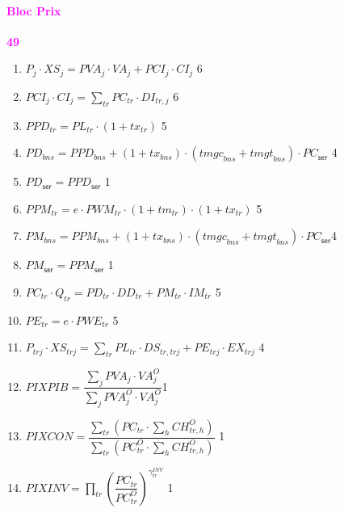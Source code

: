 \documentclass[11pt,a4paper]{article}
\newcommand{\trj}{\mathit{trj}}
\newcommand{\bns}{\mathit{bns}}
\newcommand{\CI}{\mathit{CI}}
\newcommand{\CH}{\mathit{CH}}
\newcommand{\DD}{\mathit{DD}}
\newcommand{\DI}{\mathit{DI}}
\newcommand{\DS}{\mathit{DS}}
\newcommand{\EX}{\mathit{EX}}
\newcommand{\IM}{\mathit{IM}}
\newcommand{\INV}{\mathit{INV}}
\newcommand{\ser}{\mathsf{ser}}
\newcommand{\PE}{\mathit{PE}}
\newcommand{\PC}{\mathit{PC}}
\newcommand{\PCI}{\mathit{PCI}}
\newcommand{\PD}{\mathit{PD}}
\newcommand{\PPD}{\mathit{PPD}}
\newcommand{\PIXPIB}{\mathit{PIXPIB}}
\newcommand{\PIXCON}{\mathit{PIXCON}}
\newcommand{\PIXINV}{\mathit{PIXINV}}
\newcommand{\PL}{\mathit{PL}}
\newcommand{\PM}{\mathit{PM}}
\newcommand{\PPM}{\mathit{PPM}}
\newcommand{\PWE}{\mathit{PWE}}
\newcommand{\PWM}{\mathit{PWM}}
\newcommand{\PVA}{\mathit{PVA}}
\newcommand{\tr}{\mathit{tr}}
\newcommand{\tx}{\mathit{tx}}
\newcommand{\tm}{\mathit{tm}}
\newcommand{\tmgc}{\mathit{tmgc}}
\newcommand{\tmgt}{\mathit{tmgt}}
\newcommand{\VA}{\mathit{VA}}
\newcommand{\XS}{\mathit{XS}}
\newcommand{\redparagraph}[1]{\paragraph*{\large\textcolor{Fuchsia}{#1}}}
\begin{document}
	\redparagraph{Bloc Prix}\hfill \textcolor{Fuchsia}{\textbf{49}} 
	\begin{enumerate}[itemsep=2pt,label=\textbf{eq\arabic*}.,resume,  ref=\textbf{eq\arabic*}]
		
		\item $P_{j}\cdot \XS_{j} = \PVA_{j}\cdot\VA_{j} + \PCI_{j}\cdot\CI_{j}$ \hfill 6
		
		\item $\PCI_j\cdot \CI_j = \displaystyle\sum_{\tr}\PC_{\tr}\cdot\DI_{\tr,j}$ \hfill 6
		
		\item  $\PPD_{\tr} = \PL_{\tr}\cdot\left(1 + \tx_{\tr}\right)$ \label{it:PPD}\hfill 5 
		
		\item $\PD_{\bns} = \PPD_{\bns} + \left(1 + \tx_{\bns}\right)\cdot\left(\tmgc_{\bns} + \tmgt_{\bns}\right)\cdot\PC_{\ser}$ \label{it:PDbns}\hfill 4 
		
		\item $\PD_{\ser} = \PPD_{\ser}$  \label{it:PDser}\hfill 1
		
		\item $\PPM_{\tr} = e\cdot\PWM_{\tr}\cdot\left(1+\tm_{\tr}\right)\cdot\left(1+\tx_{\tr}\right)$\label{it:PPM} \hfill 5  
		
		\item $\PM_{\bns} = \PPM_{\bns} +\left(1 + \tx_{\bns}\right)\cdot\left(\tmgc_{\bns} + \tmgt_{\bns}\right)\cdot\PC_{\ser}$\label{it:PMbns}\hfill 4
		
		\item $\PM_{\ser} = \PPM_{\ser}$ \label{it:PMser}\hfill 1
		
		\item $\PC_{\tr}\cdot Q_{\tr} = \PD_{\tr}\cdot \DD_{\tr} +\PM_{\tr}\cdot\IM_{\tr}$  \label{it:PCbns}  \hfill 5
		
		\item $\PE_{\tr} = e\cdot\PWE_{\tr}$ \hfill 5
		
		\item $P_{\trj}\cdot\XS_{\trj} =  \sum_{\tr}\PL_{\tr}\cdot\DS_{\tr,\trj} + \PE_{\trj}\cdot\EX_{\trj}$ \hfill 4
		
		\item $\PIXPIB = \dfrac{\displaystyle\sum_{j}\PVA_j\cdot\VA_j^O}{\displaystyle\sum_{j}\PVA_j^O\cdot\VA_j^O}$\hfill 1
		
		\item $\PIXCON = \dfrac{\displaystyle\sum_{\tr}\left(\PC_{\tr}\cdot\sum_{h}\CH_{\tr,h}^O\right)}{\displaystyle\sum_{\tr}\left(\PC_{\tr}^O\cdot\sum_{h}\CH_{\tr,h}^O\right)}$ \hfill 1
		
		\item $\PIXINV = \prod_{\tr}\left( \dfrac{\PC_{\tr}}{\PC_{\tr}^O}\right)^{\gamma^{\INV}_{\tr}}$ \hfill 1
		
	\end{enumerate}
	
\end{document}
